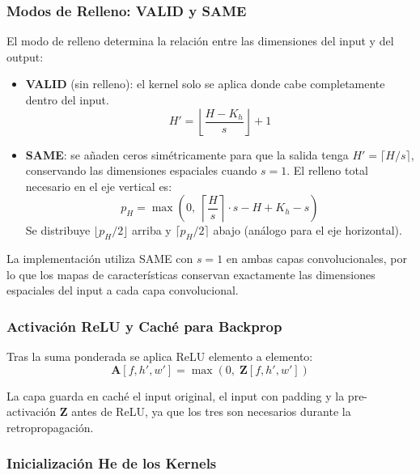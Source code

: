 \documentclass[12pt,a4paper]{article}
\begin{document}
\subsubsection{Modos de Relleno: VALID y SAME}

El modo de relleno determina la relación entre las dimensiones del input y del output:

\begin{itemize}
  \item \textbf{VALID} (sin relleno): el kernel solo se aplica donde cabe completamente
    dentro del input.
    \[H' = \left\lfloor \frac{H - K_h}{s} \right\rfloor + 1\]

  \item \textbf{SAME}: se añaden ceros simétricamente para que la salida tenga
    $H' = \lceil H / s \rceil$, conservando las dimensiones espaciales cuando $s=1$.
    El relleno total necesario en el eje vertical es:
    \begin{equation}
      p_H = \max\!\left(0,\;
        \left\lceil \frac{H}{s} \right\rceil \cdot s - H + K_h - s
      \right)
      \label{eq:same_pad}
    \end{equation}
    Se distribuye $\lfloor p_H/2 \rfloor$ arriba y $\lceil p_H/2 \rceil$ abajo
    (análogo para el eje horizontal).
\end{itemize}

La implementación utiliza SAME con $s=1$ en ambas capas convolucionales, por lo que los
mapas de características conservan exactamente las dimensiones espaciales del input a
cada capa convolucional.

\subsubsection{Activación ReLU y Caché para Backprop}

Tras la suma ponderada se aplica ReLU elemento a elemento:
\begin{equation}
  \mathbf{A}[f, h', w'] = \max\!\left(0,\; \mathbf{Z}[f, h', w']\right)
\end{equation}

La capa guarda en caché el input original, el input con padding y la pre-activación
$\mathbf{Z}$ antes de ReLU, ya que los tres son necesarios durante la retropropagación.

\subsubsection{Inicialización He de los Kernels}
\end{document}
